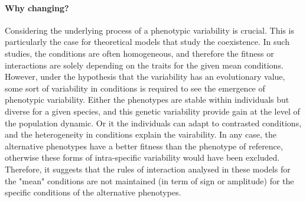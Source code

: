 %
%

\paragraph{Why changing?}

Considering the underlying process of a phenotypic variability is crucial. This is particularly the case for theoretical models that study the coexistence. In such studies, the conditions are often homogeneous, and therefore the fitness or interactions are solely depending on the traits for the given mean conditions. However, under the hypothesis that the variability has an evolutionary value, some sort of variability in conditions is required to see the emergence of phenotypic variability. Either the phenotypes are stable within individuals but diverse for a given species, and this genetic variability provide gain at the level of the population dynamic. Or it the individuals can adapt to contrasted conditions, and the heterogeneity in conditions explain the vairability. In any case, the alternative phenotypes have a better fitness than the phenotype of reference, otherwise these forms of intra-specific variability would have been excluded. Therefore, it suggests that the rules of interaction analysed in these models for the "mean" conditions are not maintained (in term of sign or amplitude) for the specific conditions of the alternative phenotypes. 

